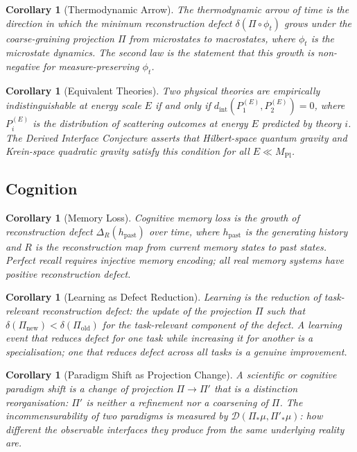 \documentclass[12pt,a4paper]{article}
\newtheorem{corollary}[theorem]{Corollary}
\theoremstyle{remark}
\theoremstyle{definition}
\begin{document}
\begin{corollary}[Thermodynamic Arrow]
The thermodynamic arrow of time is the direction in which the minimum
reconstruction defect $\delta(\Pi \circ \phi_t)$ grows under the
coarse-graining projection $\Pi$ from microstates to macrostates, where
$\phi_t$ is the microstate dynamics. The second law is the statement that
this growth is non-negative for measure-preserving $\phi_t$.
\end{corollary}

\begin{corollary}[Equivalent Theories]
Two physical theories are empirically indistinguishable at energy scale
$E$ if and only if $d_{\mathrm{int}}(P^{(E)}_1, P^{(E)}_2) = 0$, where
$P^{(E)}_i$ is the distribution of scattering outcomes at energy $E$
predicted by theory $i$. The Derived Interface Conjecture asserts that
Hilbert-space quantum gravity and Krein-space quadratic gravity satisfy
this condition for all $E \ll M_{\mathrm{Pl}}$.
\end{corollary}

\subsection{Cognition}

\begin{corollary}[Memory Loss]
Cognitive memory loss is the growth of reconstruction defect
$\Delta_R(h_{\mathrm{past}})$ over time, where $h_{\mathrm{past}}$ is
the generating history and $R$ is the reconstruction map from current
memory states to past states. Perfect recall requires injective memory
encoding; all real memory systems have positive reconstruction defect.
\end{corollary}

\begin{corollary}[Learning as Defect Reduction]
Learning is the reduction of task-relevant reconstruction defect: the
update of the projection $\Pi$ such that $\delta(\Pi_{\mathrm{new}}) <
\delta(\Pi_{\mathrm{old}})$ for the task-relevant component of the
defect. A learning event that reduces defect for one task while
increasing it for another is a specialisation; one that reduces defect
across all tasks is a genuine improvement.
\end{corollary}

\begin{corollary}[Paradigm Shift as Projection Change]
A scientific or cognitive paradigm shift is a change of projection
$\Pi \to \Pi'$ that is a distinction reorganisation: $\Pi'$ is neither
a refinement nor a coarsening of $\Pi$. The incommensurability of two
paradigms is measured by $\mathcal{D}(\Pi_*\mu, \Pi'_*\mu)$: how
different the observable interfaces they produce from the same underlying
reality are.
\end{corollary}
\end{document}

